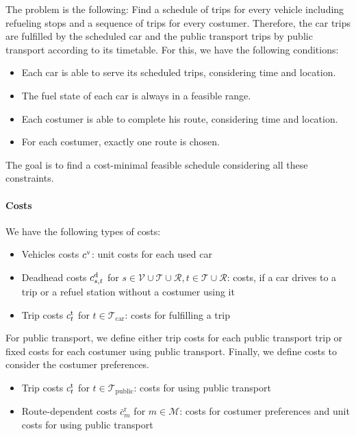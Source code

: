 The problem is the following: Find a schedule of trips for every vehicle including refueling stops and a sequence of trips for every costumer. Therefore, the car trips are fulfilled by the scheduled car and the public transport trips by public transport according to its timetable. For this, we have the following conditions:

\begin{itemize}
	\item{Each car is able to serve its scheduled trips, considering time and location.}
	\item{The fuel state of each car is always in a feasible range.}
	\item{Each costumer is able to complete his route, considering time and location.}
	\item{For each costumer, exactly one route is chosen.}
\end{itemize}

The goal is to find a cost-minimal feasible schedule considering all these constraints.

\paragraph{Costs} \parfill

We have the following types of costs:

\begin{itemize}
	\item{Vehicles costs $c^{\operatorname{v}}$: unit costs for each used car}
	\item{Deadhead costs $c^{\operatorname{d}}_{s,t}$ for $s\in\mathcal{V}\cup\mathcal{T}\cup\mathcal{R}, t\in\mathcal{T}\cup\mathcal{R}$: costs, if a car drives to a trip or a refuel station without a costumer using it}
	\item{Trip costs $c^{\operatorname{t}}_t$ for $t\in\mathcal{T}_{\operatorname{car}}$: costs for fulfilling a trip}
\end{itemize}

For public transport, we define either trip costs for each public transport trip or fixed costs for each costumer using public transport. Finally, we define costs to consider the costumer preferences.

\begin{itemize}
	\item{Trip costs $c^{\operatorname{t}}_t$ for $t\in\mathcal{T}_{\operatorname{public}}$: costs for using public transport}
	\item{Route-dependent costs $\bar{c}^{\operatorname{r}}_m$ for $m\in\mathcal{M}$: costs for costumer preferences and unit costs for using public transport}
\end{itemize}


